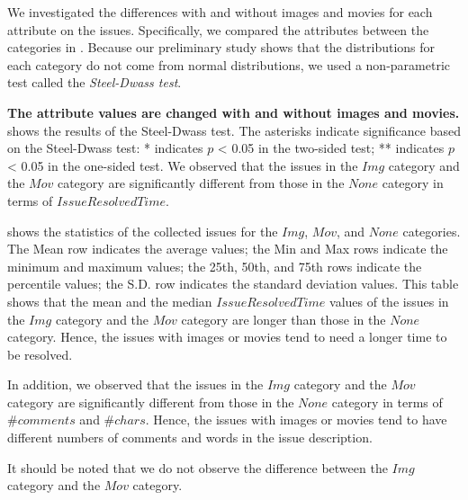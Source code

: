 


We investigated 
the differences with and without images and movies 
for each attribute on the issues. 
Specifically, we compared the attributes between 
the categories in . 
Because our preliminary study shows that 
the distributions for each category do not 
come from normal distributions, 
we used a non-parametric test called the \textit{Steel-Dwass test}. 

\textbf{The attribute values are changed 
with and without images and movies.}
 shows the results of 
the Steel-Dwass test. 
The asterisks indicate significance based on 
the Steel-Dwass test: * indicates $p$ < 0.05 in 
the two-sided test; 
** indicates $p$ < 0.05 in the one-sided test. 
We observed that the issues in the $Img$ category and 
the $Mov$ category are significantly different from those 
in the $None$ category in terms of $IssueResolvedTime$. 


 shows the statistics
of the collected issues for the $Img$, $Mov$,
and $None$ categories.
The Mean row indicates the average values; 
the Min and Max rows indicate the minimum and maximum values; 
the 25th, 50th, and 75th rows indicate the percentile values; 
the S.D. row indicates the standard deviation values. 
This table shows that 
the mean and the median $IssueResolvedTime$ values of 
the issues in the $Img$ category and the $Mov$ category are 
longer than those in the $None$ category. 
Hence, the issues with images or movies tend to need 
a longer time to be resolved. 

In addition, we observed that the issues in 
the $Img$ category and the $Mov$ category are 
significantly different from those in 
the $None$ category in terms of $\#comments$ and 
$\#chars$. 
Hence, the issues with images or movies 
tend to have different numbers of 
comments and words in the issue description.

It should be noted that we do not observe 
the difference between the $Img$ category and 
the $Mov$ category. 





